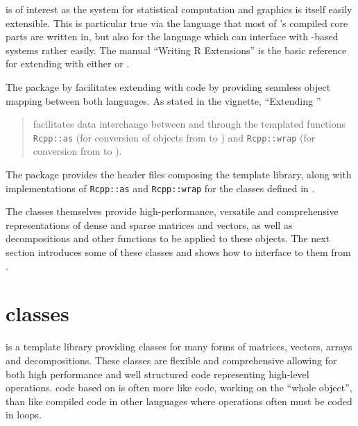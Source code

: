 \documentclass[shortnames,article,nojss]{jss}
\begin{document}
 is of interest as the  system for statistical
computation and graphics \citep{R:Main} is itself easily extensible. This is
particular true via the  language that most of 's
compiled core parts are written in, but also for the  language
which can interface with -based systems rather easily. The manual
``Writing R Extensions'' \citep{R:Extensions} is the basic reference for
extending  with either  or .

The  package by \citet{JSS:Rcpp,CRAN:Rcpp} facilitates extending
 with  code by providing seamless object mapping
between both languages.
%
As stated in the  \citep{CRAN:Rcpp} vignette, ``Extending ''
\begin{quote}
   facilitates data interchange between  and
   through the templated functions \texttt{Rcpp::as} (for
  conversion of objects from  to ) and
  \texttt{Rcpp::wrap} (for conversion from  to ).
\end{quote}
The  package provides the header files composing the
  template library, along with implementations of
\texttt{Rcpp::as} and \texttt{Rcpp::wrap} for the 
classes defined in .

The  classes themselves provide high-performance,
versatile and comprehensive representations of dense and sparse
matrices and vectors, as well as decompositions and other functions
to be applied to these objects.  The next section introduces some
of these classes and shows how to interface to them from .

\section[Eigen classes]{ classes}
\label{sec:eclasses}

 is a  template library providing classes for
many forms of matrices, vectors, arrays and decompositions.  These
classes are flexible and comprehensive allowing for both high
performance and well structured code representing high-level
operations.  code based on  is often more like
 code, working on the ``whole object'', than like compiled
code in other languages where operations often must be coded in loops.
\end{document}
